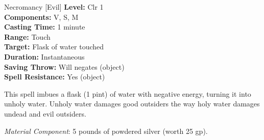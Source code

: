 {Necromancy [Evil]}
{
	\textbf{Level:}
	Clr 1\\
	\textbf{Components:}
	V, S, M\\
	\textbf{Casting Time:}
	1 minute\\
	\textbf{Range:}
	Touch\\
	\textbf{Target:}
	Flask of water touched\\
	\textbf{Duration:}
	Instantaneous\\
	\textbf{Saving Throw:}
	Will negates (object)\\
	\textbf{Spell Resistance:}
	Yes (object)\\
}
{
	This spell imbues a flask (1 pint) of water with negative energy, turning it into unholy water. Unholy water damages good outsiders the way holy water damages undead and evil outsiders.

	\textit{Material Component}:
	5 pounds of powdered silver (worth 25 gp).

}
